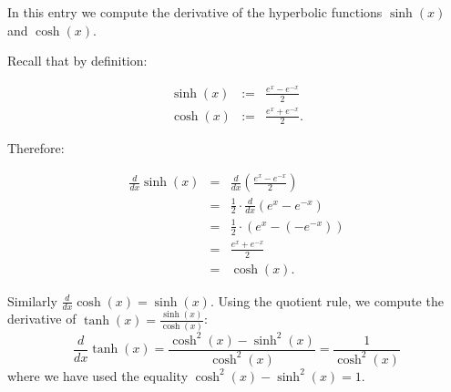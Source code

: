 \documentclass[12pt]{article}
\begin{document}
In this entry we compute the derivative of the hyperbolic functions $\sinh(x)$ and $\cosh(x)$.

Recall that by definition:

\begin{eqnarray*}
\sinh(x)&:=&\frac{e^x-e^{-x}}{2}\\
\cosh(x)&:=&\frac{e^x+e^{-x}}{2}.
\end{eqnarray*}

Therefore:

\begin{eqnarray*}
\frac{d}{dx}\sinh(x) &=& \frac{d}{dx}\left(\frac{e^x-e^{-x}}{2}\right)\\
&=& \frac{1}{2}\cdot\frac{d}{dx}\left(e^x-e^{-x}\right)\\
&=& \frac{1}{2}\cdot\left(e^x-(-e^{-x})\right)\\
&=& \frac{e^x+e^{-x}}{2}\\
&=& \cosh(x).
\end{eqnarray*}

Similarly $\displaystyle \frac{d}{dx}\cosh(x)=\sinh(x)$. Using the quotient rule, we compute the derivative of $\displaystyle \tanh(x)=\frac{\sinh(x)}{\cosh(x)}$:
$$\frac{d}{dx}\tanh(x)=\frac{\cosh^2(x)-\sinh^2(x)}{\cosh^2(x)}=\frac{1}{\cosh^2(x)}$$
where we have used the equality $\cosh^2(x)-\sinh^2(x)=1$.
\end{document}
